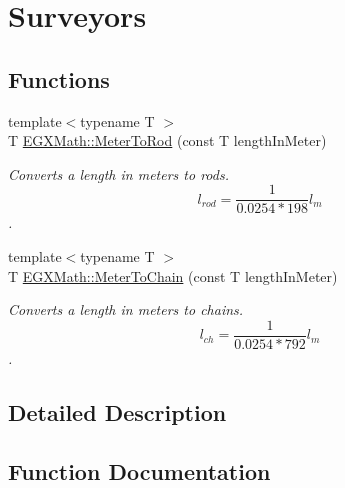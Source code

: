 \hypertarget{group___e_g_x_math-_conversions-_length_conversions-_meter-_surveyors}{}\section{Surveyors}
\label{group___e_g_x_math-_conversions-_length_conversions-_meter-_surveyors}
\subsection*{Functions}
\begin{DoxyCompactItemize}
\item 
{\footnotesize template$<$typename T $>$ }\\T \mbox{\hyperlink{group___e_g_x_math-_conversions-_length_conversions-_meter-_surveyors_ga45c89e4e6dd1d1e3f2a6c4f4a1051543}{E\+G\+X\+Math\+::\+Meter\+To\+Rod}} (const T length\+In\+Meter)
\begin{DoxyCompactList}\small\item\em Converts a length in meters to rods. \[ l_{rod}= \frac{1}{0.0254 * 198} l_{m} \]. \end{DoxyCompactList}\item 
{\footnotesize template$<$typename T $>$ }\\T \mbox{\hyperlink{group___e_g_x_math-_conversions-_length_conversions-_meter-_surveyors_ga67b4e6d6a387e3da5f93fd32b5d17764}{E\+G\+X\+Math\+::\+Meter\+To\+Chain}} (const T length\+In\+Meter)
\begin{DoxyCompactList}\small\item\em Converts a length in meters to chains. \[ l_{ch}= \frac{1}{0.0254 * 792} l_{m} \]. \end{DoxyCompactList}\end{DoxyCompactItemize}


\subsection{Detailed Description}


\subsection{Function Documentation}
\mbox{\label{group___e_g_x_math-_conversions-_length_conversions-_meter-_surveyors_ga67b4e6d6a387e3da5f93fd32b5d17764}} 
